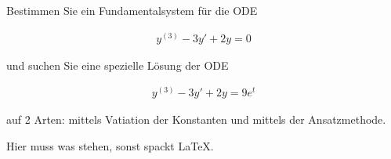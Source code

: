 \begin{exercise}
  Bestimmen Sie ein Fundamentalsystem für die ODE

  \begin{align*}
    y^{(3)} - 3y' + 2y = 0
  \end{align*}

  und suchen Sie eine spezielle Lösung der ODE

  \begin{align*}
    y^{(3)} - 3y' + 2y = 9 e^t
  \end{align*}

  auf 2 Arten:  mittels Vatiation der Konstanten und mittels der Ansatzmethode.
\end{exercise}

\begin{solution}
Hier muss was stehen, sonst spackt \LaTeX.
\end{solution}
